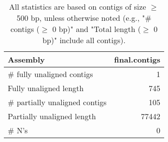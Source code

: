 \documentclass[12pt,a4paper]{article}
\begin{document}
\begin{table}[ht]
\begin{center}
\caption{All statistics are based on contigs of size $\geq$ 500 bp, unless otherwise noted (e.g., "\# contigs ($\geq$ 0 bp)" and "Total length ($\geq$ 0 bp)" include all contigs).}
\begin{tabular}{|l*{1}{|r}|}
\hline
Assembly & final.contigs \\ \hline
\# fully unaligned contigs & 1 \\ \hline
Fully unaligned length & 745 \\ \hline
\# partially unaligned contigs & 105 \\ \hline
Partially unaligned length & 77442 \\ \hline
\# N's & 0 \\ \hline
\end{tabular}
\end{center}
\end{table}
\end{document}
